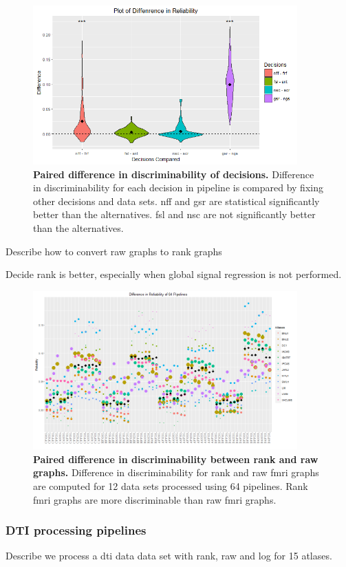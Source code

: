 \documentclass{article}
\begin{document}
\begin{figure}[ht!]
	\includegraphics[width=4.0in]{../Figs/Differ_violin_mean.png}
	\caption{{ \bf Paired difference in discriminability of decisions.} Difference in discriminability for each decision in pipeline is compared by fixing other decisions and data sets. nff and gsr are statistical significantly better than the alternatives. fsl and nsc are not significantly better than the alternatives.}
	\label{fig:7}
\end{figure}

 Describe how to convert raw graphs to rank graphs

 Decide rank is better, especially when global signal regression is not performed.
\begin{figure}[ht!]
	\includegraphics[width=4.0in]{../Figs/64_pipelines_differ.png}
	\caption{{ \bf Paired difference in discriminability between rank and raw graphs.} Difference in discriminability for rank and raw fmri graphs are computed for 12 data sets processed using 64 pipelines. Rank fmri graphs are more discriminable than raw fmri graphs.}
	\label{fig:7}
\end{figure}




\subsubsection{DTI processing pipelines}
 Describe we process a  dti data data set with rank, raw and log for 15 atlases. 
\end{document}
